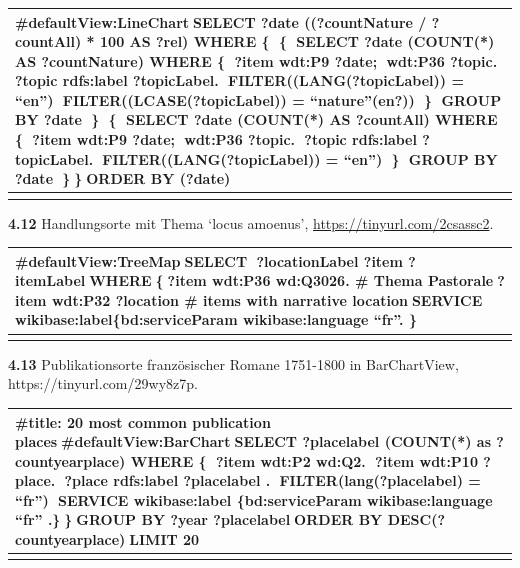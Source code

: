 \documentclass[
  12pt,
  letterpaper,
  DIV=11,
  numbers=noendperiod]{scrreprt}
\begin{document}
\begin{longtable}[]{@{}
  >{\raggedright\arraybackslash}p{}@{}}
\toprule\noalign{}
\begin{minipage}[b]{\linewidth}\raggedright
\#defaultView:LineChartSELECT ?date ((?countNature / ?countAll) * 100 AS
?rel) WHERE \{ \{ SELECT ?date (COUNT(*) AS ?countNature) WHERE \{ ?item
wdt:P9 ?date; wdt:P36 ?topic. ?topic rdfs:label ?topicLabel.
FILTER((LANG(?topicLabel)) = ``en'') FILTER((LCASE(?topicLabel)) =
``nature''(\textbf{en?})) \} GROUP BY ?date \} \{ SELECT ?date (COUNT(*)
AS ?countAll) WHERE \{ ?item wdt:P9 ?date; wdt:P36 ?topic. ?topic
rdfs:label ?topicLabel. FILTER((LANG(?topicLabel)) = ``en'') \} GROUP BY
?date \}\}ORDER BY (?date)
\end{minipage} \\
\midrule\noalign{}
\endhead
\bottomrule\noalign{}
\endlastfoot
\end{longtable}

\textbf{4.12} Handlungsorte mit Thema `locus amoenus',
\url{https://tinyurl.com/2csassc2}.

\begin{longtable}[]{@{}
  >{\raggedright\arraybackslash}p{}@{}}
\toprule\noalign{}
\begin{minipage}[b]{\linewidth}\raggedright
\#defaultView:TreeMapSELECT ?locationLabel ?item ?itemLabelWHERE\{?item
wdt:P36 wd:Q3026. \# Thema Pastorale?item wdt:P32 ?location \# items
with narrative locationSERVICE wikibase:label\{bd:serviceParam
wikibase:language ``fr''. \}
\end{minipage} \\
\midrule\noalign{}
\endhead
\bottomrule\noalign{}
\endlastfoot
\end{longtable}

\textbf{4.13} Publikationsorte französischer Romane 1751-1800 in
BarChartView, https://tinyurl.com/29wy8z7p.

\begin{longtable}[]{@{}
  >{\raggedright\arraybackslash}p{}@{}}
\toprule\noalign{}
\begin{minipage}[b]{\linewidth}\raggedright
\#title: 20 most common publication places\#defaultView:BarChartSELECT
?placelabel (COUNT(*) as ?countyearplace) WHERE \{ ?item wdt:P2 wd:Q2.
?item wdt:P10 ?place. ?place rdfs:label ?placelabel .
FILTER(lang(?placelabel) = ``fr'') SERVICE wikibase:label
\{bd:serviceParam wikibase:language ``fr'' .\}\}GROUP BY ?year
?placelabelORDER BY DESC(?countyearplace)LIMIT 20
\end{minipage} \\
\midrule\noalign{}
\endhead
\bottomrule\noalign{}
\endlastfoot
\end{longtable}
\end{document}
